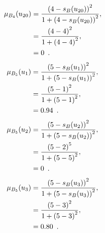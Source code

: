 \documentclass[a4paper,openany]{book}
\begin{document}
				\begin{align}
					\mu_{B_4}(u_{20}) &= \frac{\left(4-s_B(u_{20})\right)^2}{1 + \left(4-s_B(u_{20})\right)^2} ,\\
					&= \frac{\left(4-4\right)^2}{1 + \left(4-4\right)^2} \notag ,\\
					&= 0 \enspace. \notag
				\end{align}
				\begin{align}
					\mu_{B_5}(u_1) &= \frac{\left(5-s_B(u_1)\right)^2}{1 + \left(5-s_B(u_1)\right)^2} ,\\
					&= \frac{\left(5-1\right)^2}{1 + \left(5-1\right)^2} \notag ,\\
					&= 0.94 \enspace. \notag
				\end{align}
				\begin{align}
					\mu_{B_5}(u_2) &= \frac{\left(5-s_B(u_2)\right)^2}{1 + \left(5-s_B(u_2)\right)^2} ,\\
					&= \frac{\left(5-2\right)^5}{1 + \left(5-5\right)^2} \notag ,\\
					&= 0 \enspace. \notag
				\end{align}
				\begin{align}
					\mu_{B_5}(u_3) &= \frac{\left(5-s_B(u_3)\right)^2}{1 + \left(5-s_B(u_3)\right)^2} ,\\
					&= \frac{\left(5-3\right)^2}{1 + \left(5-3\right)^2} \notag ,\\
					&= 0.80 \enspace. \notag
				\end{align}
\end{document}

